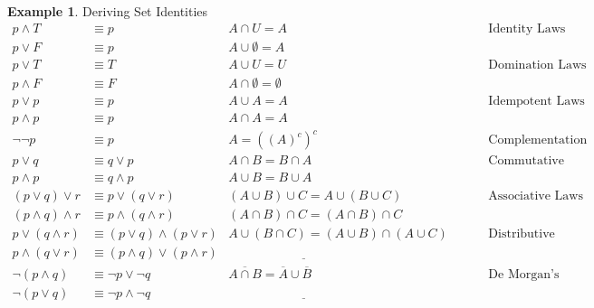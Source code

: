 \documentclass[letterpaper,10pt]{article}
\theoremstyle{plain}
\theoremstyle{definition}
\newtheorem{exmp}[thm]{Example}
\theoremstyle{remark}
\providecommand{\land}{\ensuremath{\wedge}}
\providecommand{\lor}{\ensuremath{\vee}}
\begin{document}
\begin{exmp}Deriving Set Identities
\begin{align}
p \land T &\equiv p  &A\cap U=A \hspace{1cm}& \text{Identity Laws}\\
p \lor F &\equiv p  &A\cup \emptyset=A \hspace{1cm}& \\
p \lor T & \equiv T &A\cup U=U \hspace{1cm}& \text{Domination Laws}\\
p \land F & \equiv F &A\cap \emptyset=\emptyset \hspace{1cm}& \\
p \lor p & \equiv p &A\cup A=A \hspace{1cm}& \text{Idempotent Laws}\\
p \land p & \equiv p &A\cap A=A\hspace{1cm}& \\
\lnot \lnot p & \equiv p &A=((A)^c)^c\hspace{1cm}& \text{Complementation}\\
p \lor q & \equiv q \lor p &A\cap B=B\cap A\hspace{1cm}& \text{Commutative Laws}\\
p \land p & \equiv q \land p &A\cup B=B\cup A\hspace{1cm}& \\
(p \lor q) \lor r & \equiv p \lor (q \lor r) &(A\cup B)\cup C=A\cup (B\cup C)\hspace{1cm}& \text{Associative Laws}\\
(p \land q) \land r & \equiv p \land (q \land r)&(A\cap B)\cap C=(A\cap B)\cap C\hspace{1cm}& \\
p \lor (q\land r) & \equiv (p \lor q ) \land 
 (p \lor r)  &A \cup (B\cap C) = (A \cup B ) \cap 
 (A \cup C)\hspace{1cm}& \text{Distributive Laws}\\
p \land (q\lor r) & \equiv (p \land q) \lor (p \land r) &\underline{\hspace{5cm}}\hspace{1cm}& \\
\lnot (p\land q) & \equiv \lnot p \lor \lnot q & \overline{A\cap B}= \overline{A} \cup \overline{B} \hspace{1cm}& \text{De Morgan's Laws}\\
\lnot (p\lor q) & \equiv \lnot p \land \lnot q &\underline{\hspace{5cm}}\hspace{1cm}& \\

\end{align}
\end{exmp}
\end{document}

